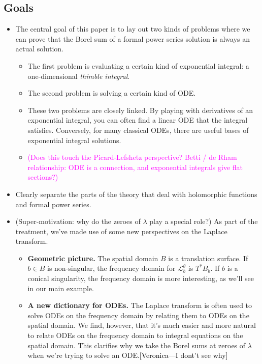\documentclass{article}
\newcommand{\laplace}{\mathcal{L}}
\begin{document}
\subsection{Goals}
\begin{itemize}
\item The central goal of this paper is to lay out two kinds of problems where we can prove that the Borel sum of a formal power series solution is always an actual solution.
\begin{itemize}
\item The first problem is evaluating a certain kind of exponential integral: a one-dimensional {\em thimble integral}.
\item The second problem is solving a certain kind of ODE.
\item These two problems are closely linked. By playing with derivatives of an exponential integral, you can often find a linear ODE that the integral satisfies. Conversely, for many classical ODEs, there are useful bases of exponential integral solutions.
\item \textcolor{magenta}{(Does this touch the Picard-Lefshetz perspective? Betti / de Rham relationship: ODE is a connection, and exponential integrals give flat sections?)}
\end{itemize}
\item Clearly separate the parts of the theory that deal with holomorphic functions and formal power series.
\item (Super-motivation: why do the zeroes of $\lambda$ play a special role?) As part of the treatment, we've made use of some new perspectives on the Laplace transform.
\begin{itemize}
\item \textbf{Geometric picture.} The spatial domain $B$ is a translation surface. If $b \in B$ is non-singular, the frequency domain for $\laplace_b^\theta$ is $T^* B_b$. If $b$ is a conical singularity, the frequency domain is more interesting, as we'll see in our main example.
\item \textbf{A new dictionary for ODEs.} The Laplace transform is often used to solve ODEs on the frequency domain by relating them to ODEs on the spatial domain. We find, however, that it's much easier and more natural to relate ODEs on the frequency domain to integral equations on the spatial domain. This clarifies why we take the Borel sums at zeroes of $\lambda$ when we're trying to solve an ODE.\textcolor{black}{[Veronica---I dont't see why]}
\end{itemize}

\end{itemize}
\end{document}
